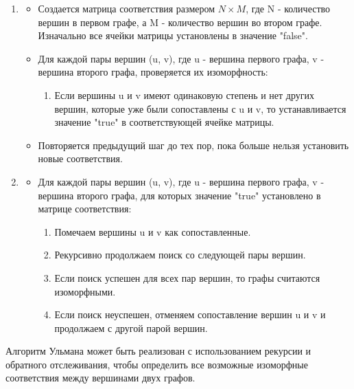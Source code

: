         \begin{enumerate}
            \item {}
                \begin{itemize}
                    \item Создается матрица соответствия размером $N \times M$, где N - количество вершин в первом графе, а M - количество вершин во втором графе. Изначально все ячейки матрицы установлены в значение "false".
                    \item Для каждой пары вершин (u, v), где u - вершина первого графа, v - вершина второго графа, проверяется их изоморфность:
                    \begin{enumerate}[label=$\star$]
                        \item Если вершины u и v имеют одинаковую степень и нет других вершин, которые уже были сопоставлены с u и v, то устанавливается значение "true" в соответствующей ячейке матрицы.
                    \end{enumerate}
                    \item Повторяется предыдущий шаг до тех пор, пока больше нельзя установить новые соответствия.
                \end{itemize}
            \item {}
                \begin{itemize}
                    \item Для каждой пары вершин (u, v), где u - вершина первого графа, v - вершина второго графа, для которых значение "true" установлено в матрице соответствия:
                    \begin{enumerate}[label=$\star$]
                        \item Помечаем вершины u и v как сопоставленные.
                        \item Рекурсивно продолжаем поиск со следующей пары вершин.
                        \item Если поиск успешен для всех пар вершин, то графы считаются изоморфными.
                        \item Если поиск неуспешен, отменяем сопоставление вершин u и v и продолжаем с другой парой вершин.
                    \end{enumerate}
                \end{itemize}
        \end{enumerate}

        Алгоритм Ульмана может быть реализован с использованием рекурсии и обратного отслеживания, чтобы определить все возможные изоморфные соответствия между вершинами двух графов.\\

